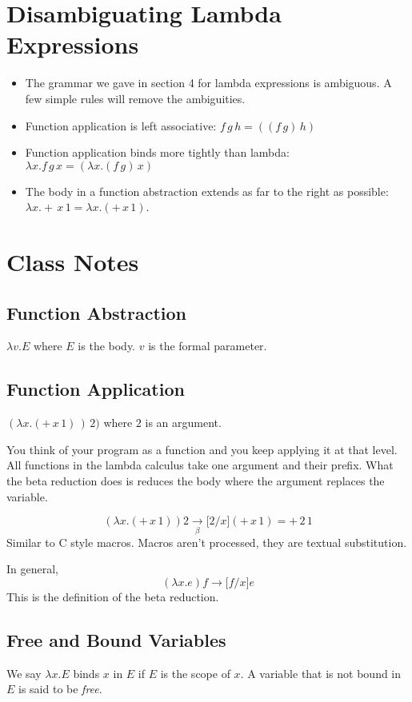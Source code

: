 \documentclass[]{article}
\begin{document}
\section{Disambiguating Lambda Expressions}
\begin{itemize}
\item The grammar we gave in section 4 for lambda expressions is ambiguous. A
few simple rules will remove the ambiguities.
\item Function application is left associative: $f\,g\,h = ((f\,g)\,h)$
\item Function application binds more tightly than lambda: $\lambda x.f\,g\,x =
(\lambda x.(f\,g)\,x)$
\item The body in a function abstraction extends as far to the right as
possible: $\lambda x.+\,x\,1=\lambda x.(+\,x\,1)$.
\end{itemize}

\section*{Class Notes}
\subsection*{Function Abstraction}
$\lambda v.E$ where $E$ is the body. $v$ is the formal parameter.

\subsection*{Function Application}
$(\lambda x.(+\,x\,1)\,)\,2)$ where $2$ is an argument.

You think of your program as a function and you keep applying it at that level.
All functions in the lambda calculus take one argument and their prefix. What
the beta reduction does is reduces the body where the argument replaces the
variable.

\[ (\lambda x.(+\,x\,1))2\underset{\beta}{\rightarrow} \lbrack 2/x
\rbrack(+\,x\,1) = +\,2\,1 \]
Similar to C style macros. Macros aren't processed, they are textual
substitution.

In general,
\[ (\lambda x.e)f \rightarrow \lbrack f/x \rbrack e \]
This is the definition of the beta reduction.

\subsection*{Free and Bound Variables}
We say $\lambda x.E$ binds $x$ in $E$ if $E$ is the scope of $x$. A variable
that is not bound in $E$ is said to be \emph{free}.
\end{document}
